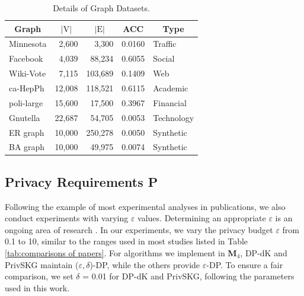 \documentclass[conference]{IEEEtran}
\theoremstyle{plain}
\begin{document}
\begin{table}[t]
\small
\caption{Details of Graph Datasets.}
\label{tab:graph datasets}
\centering
\begin{threeparttable}
    \begin{tabular}{|lrrrl|}
        \hline
       \multicolumn{1}{|c|}{Graph}  & \multicolumn{1}{c|}{$|\text{V}|$}    & \multicolumn{1}{c|}{$|\text{E}|$} & \multicolumn{1}{c|}{ACC}  & \multicolumn{1}{c|}{Type}  \\ \hline
        Minnesota\tablefootnote{\url{https://networkrepository.com/road-minnesota.php}} & 2,600 & 3,300 & 0.0160 & Traffic \\
        Facebook\tablefootnote{\url{http://snap.stanford.edu/data/ego-Facebook.html}} & 4,039 & 88,234 & 0.6055 & Social  \\ 
        Wiki-Vote\tablefootnote{\url{http://snap.stanford.edu/data/wiki-Vote.html}} & 7,115 & 103,689 & 0.1409 & Web  \\ 
        ca-HepPh\tablefootnote{\url{http://snap.stanford.edu/data/ca-HepPh.html}} & 12,008 & 118,521 & 0.6115 & Academic \\
        poli-large\tablefootnote{\url{https://networkrepository.com/econ-poli-large.php}} & 15,600 & 17,500 & 0.3967 & Financial \\
        Gnutella\tablefootnote{\url{http://snap.stanford.edu/data/p2p-Gnutella25.html}} & 22,687 & 54,705 & 0.0053 & Technology \\
        ER graph & 10,000 & 250,278 & 0.0050 & Synthetic \\
        BA graph & 10,000 & 49,975 & 0.0074 & Synthetic\\
        \hline
    \end{tabular}
\end{threeparttable}
\end{table}

\subsection{Privacy Requirements \textbf{P}}
Following the example of most experimental analyses in publications, we also conduct experiments with varying $\varepsilon$ values.
Determining an appropriate $\varepsilon$ is an ongoing area of research \cite{dwork2019differential,kasiviswanathan2014semantics,lee2011much,pankova2022interpreting}. 
In our experiments, we vary the privacy budget $\varepsilon$ from 0.1 to 10, similar to the ranges used in most studies listed in Table \ref{tab:comparisons of papers}.
For algorithms we implement in \textbf{M$_4$}, DP-dK \cite{wang2013preserving} and PrivSKG \cite{mir2012differentially} maintain ($\varepsilon,\delta$)-DP, while the others provide $\varepsilon$-DP.
To ensure a fair comparison, we set $\delta$ = 0.01 for DP-dK and PrivSKG, following the parameters used in this work\cite{wang2013preserving,mir2012differentially}.
\end{document}
